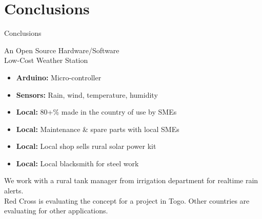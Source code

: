 \documentclass[xcolor=dvipsnames,beamer,unknownkeysallowed]{beamer} %
\begin{document}
\section{Conclusions}
\begin{frame}[fragile]{Conclusions}

\begin{block}{An Open Source Hardware/Software\\ Low-Cost Weather Station}
\begin{itemize} 
 \item {\bf Arduino:} Micro-controller 
 \item {\bf Sensors:} Rain, wind, temperature, humidity
 \item {\bf Local:} 80+\% made in the country of use by SMEs
 \item {\bf Local:} Maintenance \& spare parts with local SMEs
 \item {\bf Local:} Local shop sells rural solar power kit
 \item {\bf Local:} Local blacksmith for steel work
\end{itemize}
We work with a rural tank manager from irrigation department for realtime rain alerts.\\Red Cross is evaluating the concept for a project in Togo. Other countries are evaluating for other applications.
\end{block}

\end{frame}
\end{document}
